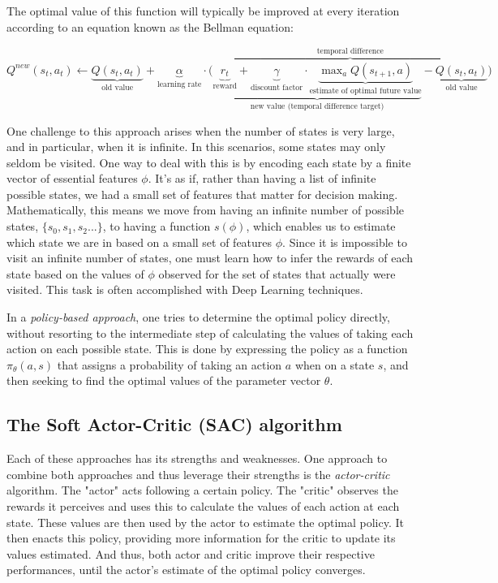 \documentclass{article}
\begin{document}
The optimal value of this function will typically be improved at every iteration according to an equation known as the Bellman equation:

$
Q^{new}(s_{t},a_{t}) \leftarrow \underbrace{Q(s_{t},a_{t})}_{\text{old value}} + \underbrace{\alpha}_{\text{learning rate}} \cdot  \overbrace{\bigg( \underbrace{\underbrace{r_{t}}_{\text{reward}} + \underbrace{\gamma}_{\text{discount factor}} \cdot \underbrace{\max_{a}Q(s_{t+1}, a)}_{\text{estimate of optimal future value}}}_{\text{new value (temporal difference target)}} - \underbrace{Q(s_{t},a_{t})}_{\text{old value}} \bigg) }^{\text{temporal difference}}
$

One challenge to this approach arises when the number of states is very large, and in particular, when it is infinite. In this scenarios, some states may only seldom be visited. One way to deal with this is by encoding each state by a finite vector of essential features $\phi$. It's as if, rather than having a list of infinite possible states, we had a small set of features that matter for decision making. Mathematically, this means we move from having an infinite number of possible states, $\{s_0, s_1,s_2...\}$, to having a function $s(\phi)$, which enables us to estimate which state we are in based on a small set of features $\phi$. Since it is impossible to visit an infinite number of states, one must learn how to infer the rewards of each state based on the values of $\phi$ observed for the set of states that actually were visited. This task is often accomplished with Deep Learning techniques.

In a \emph{policy-based approach}, one tries to determine the optimal policy directly, without resorting to the intermediate step of calculating the values of taking each action on each possible state. This is done by expressing the policy as a function $\pi_\theta(a,s)$ that assigns a probability of taking an action $a$ when on a state $s$, and then seeking to find the optimal values of the parameter vector $\theta$. 

\subsection{The Soft Actor-Critic (SAC) algorithm}

Each of these approaches has its strengths and weaknesses. One approach to combine both approaches and thus leverage their strengths is the \emph{actor-critic} algorithm. The "actor" acts following a certain policy. The "critic" observes the rewards it perceives and uses this to calculate the values of each action at each state. These values are then used by the actor to estimate the optimal policy. It then enacts this policy, providing more information for the critic to update its values estimated. And thus, both actor and critic improve their respective performances, until the actor's estimate of the optimal policy converges.
\end{document}
